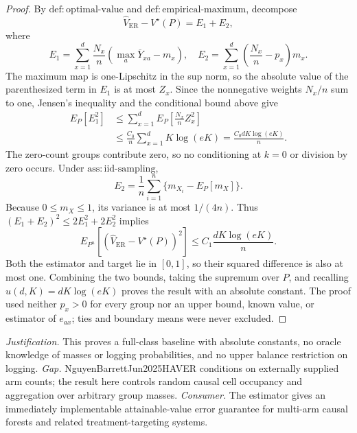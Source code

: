 \documentclass{article}
\begin{document}
\begin{proof}
By \(\mathrm{def{:}optimal\text{-}value}\) and \(\mathrm{def{:}empirical\text{-}maximum}\), decompose
\[
 \widehat V_{\mathrm{ER}}-V^\star(P)=E_1+E_2,
\]
where
\[
 E_1=\sum_{x=1}^d\frac{N_x}{n}
 \left(\max_a\overline Y_{xa}-m_x\right),
 \quad
 E_2=\sum_{x=1}^d\left(\frac{N_x}{n}-p_x\right)m_x.
\]
The maximum map is one-Lipschitz in the sup norm, so the absolute value of the parenthesized term in \(E_1\) is at most \(Z_x\).  Since the nonnegative weights \(N_x/n\) sum to one, Jensen's inequality and the conditional bound above give
\[
 \begin{aligned}
 E_P[E_1^2]
 &\leq\sum_{x=1}^d E_P\left[\frac{N_x}{n}Z_x^2\right]\\
 &\leq\frac{C_0}{n}\sum_{x=1}^d K\log(eK)
 =\frac{C_0dK\log(eK)}n.
\end{aligned}
\]
The zero-count groups contribute zero, so no conditioning at \(k=0\) or division by zero occurs.  Under \(\mathrm{ass{:}iid\text{-}sampling}\),
\[
 E_2=\frac1n\sum_{i=1}^n\{m_{X_i}-E_P[m_X]\}.
\]
Because \(0\leq m_X\leq1\), its variance is at most \(1/(4n)\).  Thus \((E_1+E_2)^2\leq2E_1^2+2E_2^2\) implies
\[
 E_{P^n}[(\widehat V_{\mathrm{ER}}-V^\star(P))^2]
 \leq C_1\frac{dK\log(eK)}n.
\]
Both the estimator and target lie in \([0,1]\), so their squared difference is also at most one.  Combining the two bounds, taking the supremum over \(P\), and recalling \(u(d,K)=dK\log(eK)\) proves the result with an absolute constant.  The proof used neither \(p_x>0\) for every group nor an upper bound, known value, or estimator of \(e_{ax}\); ties and boundary means were never excluded.
\end{proof}
\par\smallskip\noindent \textit{Justification.} This proves a full-class baseline with absolute constants, no oracle knowledge of masses or logging probabilities, and no upper balance restriction on logging. \textit{Gap.} NguyenBarrettJun2025HAVER conditions on externally supplied arm counts; the result here controls random causal cell occupancy and aggregation over arbitrary group masses. \textit{Consumer.} The estimator gives an immediately implementable attainable-value error guarantee for multi-arm causal forests and related treatment-targeting systems.
\end{document}
